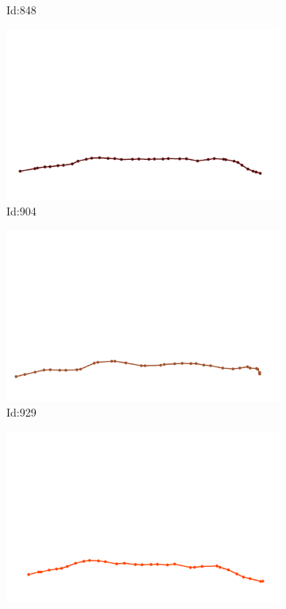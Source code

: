 \documentclass[12pt,twoside]{report}
\begin{document}
\begin{figure}
\begin{subfigure}[b]{0.20\textwidth}
\caption{Id:848}
\end{subfigure}
\begin{subfigure}[b]{0.20\textwidth}
\centering
\includegraphics[width=\textwidth]{../../trajectories/904.png}
\caption{Id:904}
\end{subfigure}
\begin{subfigure}[b]{0.20\textwidth}
\centering
\includegraphics[width=\textwidth]{../../trajectories/929.png}
\caption{Id:929}
\end{subfigure}
\begin{subfigure}[b]{0.20\textwidth}
\centering
\includegraphics[width=\textwidth]{../../trajectories/947.png}

\end{subfigure}
\end{figure}
\end{document}
